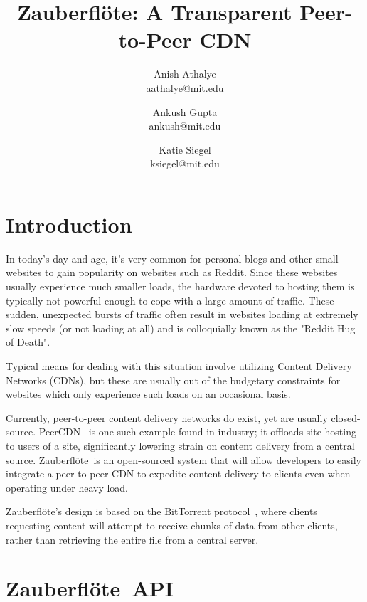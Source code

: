 \documentclass[letterpaper,twocolumn,10pt]{article}
\newcommand{\zbf}{Zauberfl\"{o}te}
\newcommand{\projtitle}{\zbf: A Transparent Peer-to-Peer CDN}
\begin{document}
\title{\Large \bf \projtitle}

\author{
    {\rm Anish Athalye}\\
    aathalye@mit.edu
    \and
    {\rm Ankush Gupta}\\
    ankush@mit.edu
    \and
    {\rm Katie Siegel}\\
    ksiegel@mit.edu
}

\maketitle
\thispagestyle{empty}

\begin{abstract}
\end{abstract}

\section{Introduction}
In today's day and age, it's very common for personal blogs and other small websites to gain popularity on websites such as Reddit. Since these websites usually experience much smaller loads, the hardware devoted to hosting them is typically not powerful enough to cope with a large amount of traffic. These sudden, unexpected bursts of traffic often result in websites loading at extremely slow speeds (or not loading at all) and is colloquially known as the "Reddit Hug of Death".

Typical means for dealing with this situation involve utilizing Content Delivery Networks (CDNs), but these are usually out of the budgetary constraints for websites which only experience such loads on an occasional basis.

Currently, peer-to-peer content delivery networks do exist, yet are usually
closed-source. PeerCDN~\cite{peercdn} is one such example found in
industry; it offloads site hosting to users of a site, significantly lowering strain on content delivery from a central source. \zbf\ is an open-sourced system
that will allow developers to easily integrate a peer-to-peer CDN to expedite
content delivery to clients even when operating under heavy load.

\zbf's design is based on the BitTorrent protocol~\cite{cohen:bittorrent}, where
clients requesting content will attempt to receive chunks of data from other
clients, rather than retrieving the entire file from a central server.

\section{\zbf\ API}
\end{document}
